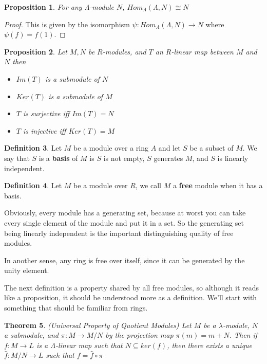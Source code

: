 \documentclass[12pt]{book}
\newtheorem{theorem}{Theorem}[chapter]
\newtheorem{proposition}[theorem]{Proposition}
\theoremstyle{definition}
\newtheorem{definition}[theorem]{Definition}
\begin{document}
\begin{proposition}
    For any $\Lambda$-module $N$, $Hom_\Lambda(\Lambda, N) \cong N$
\end{proposition}
\begin{proof}
    \label{HomProp1}
    This is given by the isomorphism $\psi : Hom_\Lambda(\Lambda, N) \to N$ where $\psi(f) = f(1)$.
\end{proof}

\begin{proposition}
    Let $M,N$ be $R$-modules, and $T$ an $R$-linear map between $M$ and $N$ then 
    \begin{itemize}
        \item $Im(T)$ is a submodule of $N$ 
        \item $Ker(T)$ is a submodule of $M$ 
        \item $T$ is surjective iff $Im(T) = N$ 
        \item $T$ is injective iff $Ker(T) = M$ 
    \end{itemize}
\end{proposition}

\begin{definition}
    Let $M$ be a module over a ring $A$ and let $S$ be a subset of $M$. We say that $S$ is a \textbf{basis} of $M$ is $S$ is not empty, $S$ generates $M$, and $S$ is linearly independent. 
\end{definition}



\begin{definition}
    Let $M$ be a module over $R$, we call $M$ a \textbf{free} module when it has a basis.
\end{definition}

Obviously, every module has a generating set, because at worst you can take every single element of the module and put it in a set. So the generating set being linearly independent is the important distinguishing quality of free modules. 

In another sense, any ring is free over itself, since it can be generated by the unity element. 

The next definition is a property shared by all free modules, so although it reads like a proposition, it should be understood more as a definition. We'll start with something that should be familiar from rings. 

\begin{theorem}
    (Universal Property of Quotient Modules) Let $M$ be a $\lambda$-module, $N$ a submodule, and $\pi : M \to M/N$ by the projection map $\pi(m) = m + N$. Then if $f : M \to L$ is a $\Lambda$-linear map such that $N \subseteq ker(f)$, then there exists a unique $\hat{f} : M/N \to L$ such that $f = \hat{f} \circ \pi$
\end{theorem}
\end{document}
